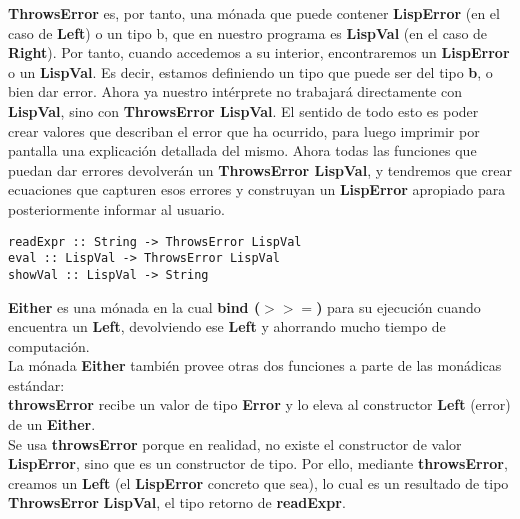 \textbf{ThrowsError} es, por tanto, una m\'onada que puede contener \textbf{LispError} (en el caso de \textbf{Left}) o un tipo b, que en nuestro programa es \textbf{LispVal} (en el caso de \textbf{Right}). Por tanto, cuando accedemos a su interior, encontraremos un \textbf{LispError} o un \textbf{LispVal}. Es decir, estamos definiendo un tipo que puede ser del tipo \textbf{b}, o bien dar error. Ahora ya nuestro int\'erprete no trabajar\'a directamente con \textbf{LispVal}, sino con \textbf{ThrowsError LispVal}. El sentido de todo esto es poder crear valores que describan el error que ha ocurrido, para luego imprimir por pantalla una explicaci\'on detallada del mismo. Ahora todas las funciones que puedan dar errores devolver\'an un \textbf{ThrowsError LispVal}, y tendremos que crear ecuaciones que capturen esos errores y construyan un \textbf{LispError} apropiado para posteriormente informar al usuario.\\

\begin{minipage}{\linewidth}
\begin{footnotesize}
\begin{lstlisting}[frame=single]
readExpr :: String -> ThrowsError LispVal
eval :: LispVal -> ThrowsError LispVal
showVal :: LispVal -> String
\end{lstlisting}
\end{footnotesize}
\end{minipage}

\textbf{Either} es una m\'onada en la cual \textbf{bind ($>>=$)} para su ejecuci\'on cuando encuentra un \textbf{Left}, devolviendo ese \textbf{Left} y ahorrando mucho tiempo de computaci\'on.\\

La m\'onada \textbf{Either} tambi\'en provee otras dos funciones a parte de las mon\'adicas est\'andar:\\

\textbf{throwsError} recibe un valor de tipo \textbf{Error} y lo eleva al constructor \textbf{Left} (error) de un \textbf{Either}.\\

Se usa \textbf{throwsError} porque en realidad, no existe el constructor de valor \textbf{LispError}, sino que es un constructor de tipo. Por ello, mediante \textbf{throwsError}, creamos un \textbf{Left} (el \textbf{LispError} concreto que sea), lo cual es un resultado de tipo \textbf{ThrowsError} \textbf{LispVal}, el tipo retorno de \textbf{readExpr}.\\

